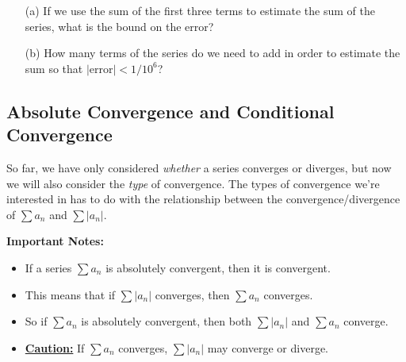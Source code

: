 \documentclass[12pt]{article}
\begin{document}
\begin{enumerate}
\item[(a)] If we use the sum of the first three terms to estimate the sum of the series, what is the bound on the error?

\vfill

\item[(b)] How many terms of the series do we need to add in order to estimate the sum so that $\big|$error$\big|<1/10^6$?

\vfill
\end{enumerate}

\newpage

\subsection*{Absolute Convergence and Conditional Convergence}

So far, we have only considered \textit{whether} a series converges or diverges, but now we will also consider the \textit{type} of convergence. The types of convergence we're interested in has to do with the relationship between the convergence/divergence of $\sum a_n$ and $\sum |a_n|$. 

\vspace{5mm}


\vspace{5mm}

\textbf{Important Notes:}
\begin{itemize}
	\item If a series $\sum a_n$ is absolutely convergent, then it is convergent.
	\item This means that if $\sum |a_n|$ converges, then $\sum a_n$ converges.
	\item So if $\sum a_n$ is absolutely convergent, then both $\sum |a_n|$ and $\sum a_n$ converge.
	\item \textbf{\underline{Caution:}} If $\sum a_n$ converges, $\sum |a_n|$ may converge or diverge.
\end{itemize}

\vspace{5mm}

\end{document}
